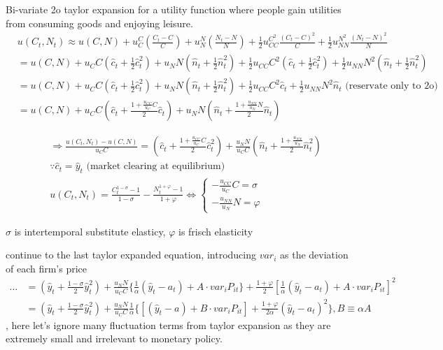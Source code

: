 Bi-variate 2o taylor expansion for a utility function where people gain utilities from consuming goods and enjoying leisure.
\begin{align}
& u(C_t,N_t)\approx u(C,N)+u_C^C (\frac{C_t -C}{C})+u_N^N(\frac{N_t -N}{N})+\frac{1}{2}u_{CC}^{C^2}\frac{(C_t-C)^2}{C}+\frac{1}{2}u_{NN}^{N^2}\frac{(N_t-N)^2}{N}
\\& = u(C,N)+u_C C(\hat c_t +\frac{1}{2}\hat c_t^2)+u_N N(\hat n_t +\frac{1}{2} \hat n_t^2)+\frac{1}{2}u_{CC} C^2(\hat c_t +\frac{1}{2}\hat c_t^2)+\frac{1}{2}u_{NN} N^2(\hat n_t +\frac{1}{2}\hat n_t^2)
\\& = u(C,N)+u_C C(\hat c_t +\frac{1}{2}\hat c_t^2)+u_N N(\hat n_t +\frac{1}{2} \hat n_t^2)+\frac{1}{2}u_{CC} C^2 \hat c_t+\frac{1}{2}u_{NN} N^2 \hat n_t
\text{ (reservate only to 2o)}
\\& = u(C,N)+u_C C(\hat c_t + \frac{1+\frac{u_{CC}}{u_C}C}{2}\hat c_t)+u_N N(\hat n_t + \frac{1+\frac{u_{NN}}{u_N}N}{2}\hat n_t)
\end{align}

\begin{align}
& \Rightarrow \frac{u(C_t,N_t)-u(C,N)}{u_C C}
= (\hat c_t + \frac{1+\frac{u_{CC}}{u_C}C}{2}\hat c_t^2)+\frac{u_N N}{u_C C}(\hat n_t + \frac{1+\frac{u_{NN}}{u_N}}{2}\hat n^2_t)
\\& \because \hat c_t = \hat y_t \text{ (market clearing at equilibrium)}
\\&
u(C_t,N_t)=\frac{C_t^{1-\sigma}-1}{1-\sigma}-\frac{N_t^{1+\varphi}-1}{1+\varphi}
\iff
\begin{cases}
-\frac{u_{CC}}{u_C}C=\sigma\\
-\frac{u_{NN}}{u_N}N=\varphi
\end{cases}
\end{align}

\begin{blueblock}
\begin{note}
\end{note}
$\sigma$ is intertemporal substitute elasticy, $\varphi$ is frisch elasticity
\end{blueblock}

continue to the last taylor expanded equation, introducing $var_i$ as the deviation of each firm's price
\begin{align}
\dots &= (\hat y_t +\frac{1-\sigma}{2}\hat y_t^2)+\frac{u_N N}{u_C C}\{\frac{1}{\alpha}(\hat y_t -a_t)+A \cdot var_i P_{it}\}+\frac{1+\varphi}{2}[\frac{1}{\alpha}(\hat y_t - a_t)+A \cdot var_i P_{it}]^2
\\& = (\hat y_t +\frac{1-\sigma}{2}\hat y_t^2)+\frac{u_N N}{u_C C}\frac{1}{\alpha}\{[(\hat y_t -a)+B \cdot var_i P_{it}]+\frac{1+\varphi}{2 \alpha}(\hat y_t -a_t)^2\}, B\equiv \alpha A
\end{align}
, here let's ignore many fluctuation terms from taylor expansion as they are extremely small and irrelevant to monetary policy.

